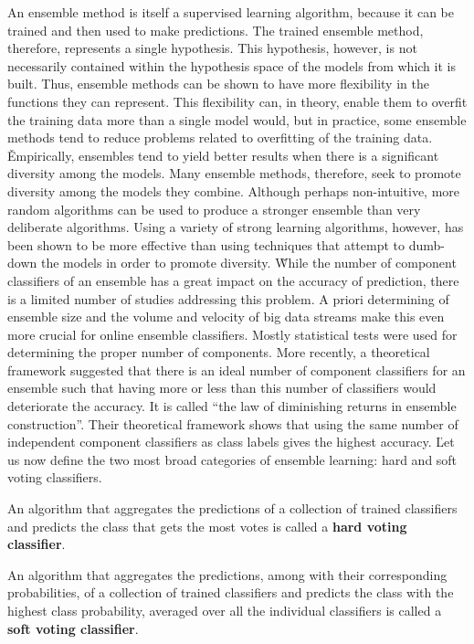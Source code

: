 An ensemble method is itself a supervised learning algorithm, because it can be trained and then used to make
predictions. The trained ensemble method, therefore, represents a single hypothesis. This hypothesis, however, is not
necessarily contained within the hypothesis space of the models from which it is built. Thus, ensemble methods can be
shown to have more flexibility in the functions they can represent. This flexibility can, in theory, enable them to
overfit the training data more than a single model would, but in practice, some ensemble methods tend to reduce
problems related to overfitting of the training data. \v

Empirically, ensembles tend to yield better results when there is a significant diversity among the models. Many
ensemble methods, therefore, seek to promote diversity among the models they combine. Although perhaps non-intuitive,
more random algorithms can be used to produce a stronger ensemble than very deliberate algorithms. Using a variety of
strong learning algorithms, however, has been shown to be more effective than using techniques that attempt to
dumb-down the models in order to promote diversity. \v

While the number of component classifiers of an ensemble has a great impact on the accuracy of prediction, there is a
limited number of studies addressing this problem. A priori determining of ensemble size and the volume and velocity
of big data streams make this even more crucial for online ensemble classifiers. Mostly statistical tests were used
for determining the proper number of components. More recently, a theoretical framework suggested that there is an
ideal number of component classifiers for an ensemble such that having more or less than this number of classifiers
would deteriorate the accuracy. It is called ``the law of diminishing returns in ensemble construction''. Their
theoretical framework shows that using the same number of independent component classifiers as class labels gives the
highest accuracy. \v

Let us now define the two most broad categories of ensemble learning: hard and soft voting classifiers.

An algorithm that aggregates the predictions of a collection of trained classifiers and predicts the class that gets
the most votes is called a \textbf{hard voting classifier}.
\ed

An algorithm that aggregates the predictions, among with their corresponding probabilities, of a collection of
trained classifiers and predicts the class with the highest class probability, averaged over all the individual
classifiers is called a \textbf{soft voting classifier}.
\ed

